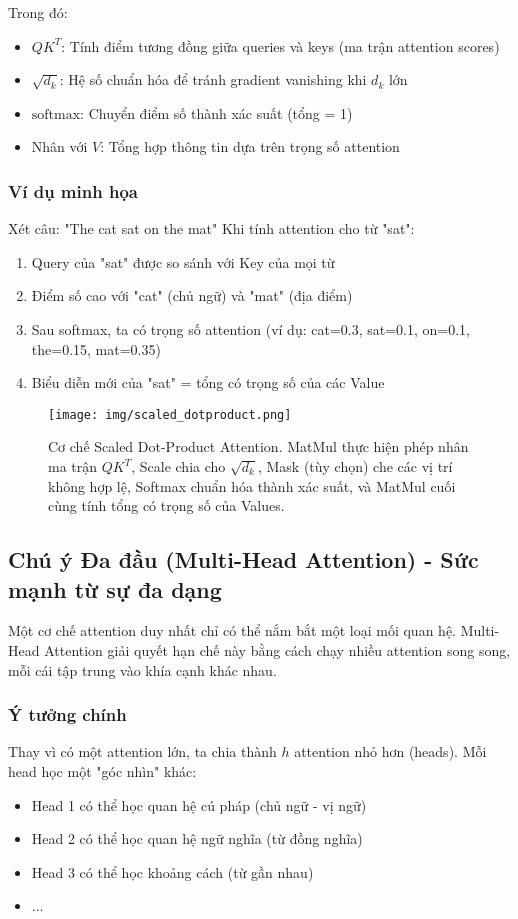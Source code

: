 Trong đó:
\begin{itemize}
    \item $QK^T$: Tính điểm tương đồng giữa queries và keys (ma trận attention scores)
    \item $\sqrt{d_k}$: Hệ số chuẩn hóa để tránh gradient vanishing khi $d_k$ lớn
    \item $\text{softmax}$: Chuyển điểm số thành xác suất (tổng = 1)
    \item Nhân với $V$: Tổng hợp thông tin dựa trên trọng số attention
\end{itemize}

\subsubsection{Ví dụ minh họa}
Xét câu: "The cat sat on the mat"
Khi tính attention cho từ "sat":
\begin{enumerate}
    \item Query của "sat" được so sánh với Key của mọi từ
    \item Điểm số cao với "cat" (chủ ngữ) và "mat" (địa điểm)
    \item Sau softmax, ta có trọng số attention (ví dụ: cat=0.3, sat=0.1, on=0.1, the=0.15, mat=0.35)
    \item Biểu diễn mới của "sat" = tổng có trọng số của các Value
\end{enumerate}

\begin{figure}[H]
    \centering
    \texttt{[image: img/scaled\_dotproduct.png]}
    \caption{Cơ chế Scaled Dot-Product Attention. MatMul thực hiện phép nhân ma trận $QK^T$, Scale chia cho $\sqrt{d_k}$, Mask (tùy chọn) che các vị trí không hợp lệ, Softmax chuẩn hóa thành xác suất, và MatMul cuối cùng tính tổng có trọng số của Values.}
    \label{fig:scaled_dot_product_attention}
\end{figure}

\subsection{Chú ý Đa đầu (Multi-Head Attention) - Sức mạnh từ sự đa dạng}
\label{ssec:multi_head_attention}
Một cơ chế attention duy nhất chỉ có thể nắm bắt một loại mối quan hệ. Multi-Head Attention giải quyết hạn chế này bằng cách chạy nhiều attention song song, mỗi cái tập trung vào khía cạnh khác nhau.

\subsubsection{Ý tưởng chính}
Thay vì có một attention lớn, ta chia thành $h$ attention nhỏ hơn (heads). Mỗi head học một "góc nhìn" khác:
\begin{itemize}
    \item Head 1 có thể học quan hệ cú pháp (chủ ngữ - vị ngữ)
    \item Head 2 có thể học quan hệ ngữ nghĩa (từ đồng nghĩa)
    \item Head 3 có thể học khoảng cách (từ gần nhau)
    \item ...
\end{itemize}

